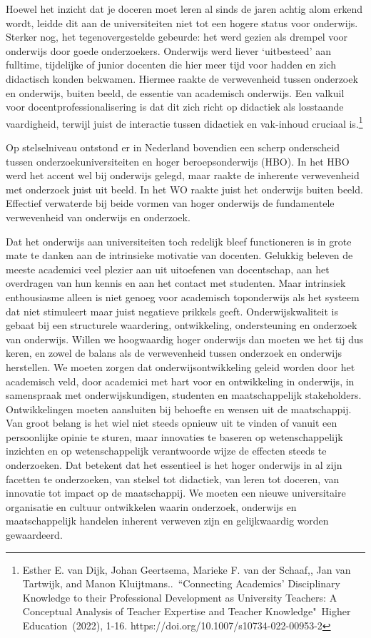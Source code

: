 \documentclass{jote-book}
\begin{document}
	Hoewel het inzicht dat je doceren moet leren al sinds de jaren achtig alom erkend wordt, leidde dit aan de universiteiten niet tot een hogere status voor onderwijs. Sterker nog, het tegenovergestelde gebeurde: het werd gezien als drempel voor onderwijs door goede onderzoekers. Onderwijs werd liever ‘uitbesteed' aan fulltime, tijdelijke of junior docenten die hier meer tijd voor hadden en zich didactisch konden bekwamen. Hiermee raakte de verwevenheid tussen onderzoek en onderwijs, buiten beeld, de essentie van academisch onderwijs. Een valkuil voor docentprofessionalisering is dat dit zich richt op didactiek als losstaande vaardigheid, terwijl juist de interactie tussen didactiek en vak-inhoud cruciaal is.\footnote{Esther E. van Dijk, Johan Geertsema, Marieke F. van der Schaaf,, Jan van Tartwijk, and Manon Kluijtmans.. “Connecting Academics' Disciplinary Knowledge to their Professional Development as University Teachers: A Conceptual Analysis of Teacher Expertise and Teacher Knowledge" Higher Education (2022), 1-16. https://doi.org/10.1007/s10734-022-00953-2}



	 Op stelselniveau ontstond er in Nederland bovendien een scherp onderscheid tussen onderzoekuniversiteiten en hoger beroepsonderwijs (HBO). In het HBO werd het accent wel bij onderwijs gelegd, maar raakte de inherente verwevenheid met onderzoek juist uit beeld. In het WO raakte juist het onderwijs buiten beeld. Effectief verwaterde bij beide vormen van hoger onderwijs de fundamentele verwevenheid van onderwijs en onderzoek.



	Dat het onderwijs aan universiteiten toch redelijk bleef functioneren is in grote mate te danken aan de intrinsieke motivatie van docenten. Gelukkig beleven de meeste academici veel plezier aan uit uitoefenen van docentschap, aan het overdragen van hun kennis en aan het contact met studenten. Maar intrinsiek enthousiasme alleen is niet genoeg voor academisch toponderwijs als het systeem dat niet stimuleert maar juist negatieve prikkels geeft. Onderwijskwaliteit is gebaat bij een structurele waardering, ontwikkeling, ondersteuning en onderzoek van onderwijs. Willen we hoogwaardig hoger onderwijs dan moeten we het tij dus keren, en zowel de balans als de verwevenheid tussen onderzoek en onderwijs herstellen. We moeten zorgen dat onderwijsontwikkeling geleid worden door het academisch veld, door academici met hart voor en ontwikkeling in onderwijs, in samenspraak met onderwijskundigen, studenten en maatschappelijk stakeholders. Ontwikkelingen moeten aansluiten bij behoefte en wensen uit de maatschappij. Van groot belang is het wiel niet steeds opnieuw uit te vinden of vanuit een persoonlijke opinie te sturen, maar innovaties te baseren op wetenschappelijk inzichten en op wetenschappelijk verantwoorde wijze de effecten steeds te onderzoeken. Dat betekent dat het essentieel is het hoger onderwijs in al zijn facetten te onderzoeken, van stelsel tot didactiek, van leren tot doceren, van innovatie tot impact op de maatschappij. We moeten een nieuwe universitaire organisatie en cultuur ontwikkelen waarin onderzoek, onderwijs en maatschappelijk handelen inherent verweven zijn en gelijkwaardig worden gewaardeerd.
\end{document}
